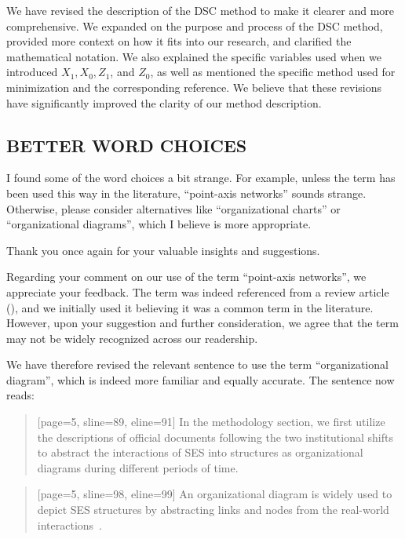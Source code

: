 \AR{} We have revised the description of the DSC method to make it clearer and more comprehensive. We expanded on the purpose and process of the DSC method, provided more context on how it fits into our research, and clarified the mathematical notation. We also explained the specific variables used when we introduced $X_1, X_0, Z_1$, and $Z_0$, as well as mentioned the specific method used for minimization and the corresponding reference. We believe that these revisions have significantly improved the clarity of our method description.

\subsection{BETTER WORD CHOICES}\label{sec:1-2}

\RC{} I found some of the word choices a bit strange. For example, unless the term has been used this way in the literature, ``point-axis networks'' sounds strange. Otherwise, please consider alternatives like ``organizational charts'' or ``organizational diagrams'', which I believe is more appropriate.

\AR{} Thank you once again for your valuable insights and suggestions.

\AR*{} Regarding your comment on our use of the term ``point-axis networks'', we appreciate your feedback. The term was indeed referenced from a review article (\cite{kluger2020}), and we initially used it believing it was a common term in the literature. However, upon your suggestion and further consideration, we agree that the term may not be widely recognized across our readership.

\AR*{} We have therefore revised the relevant sentence to use the term ``organizational diagram'', which is indeed more familiar and equally accurate. The sentence now reads:

\begin{quote}[page=5, sline=89, eline=91]
    In the methodology section, we first utilize the descriptions of official documents following the two institutional shifts to abstract the interactions of SES into structures as organizational diagrams during different periods of time.
\end{quote}

\begin{quote}[page=5, sline=98, eline=99]
    An organizational diagram is widely used to depict SES structures by abstracting links and nodes from the real-world interactions~\cite{wang2022g,bodin2017a,kluger2020,guerrero2015}.
\end{quote}

